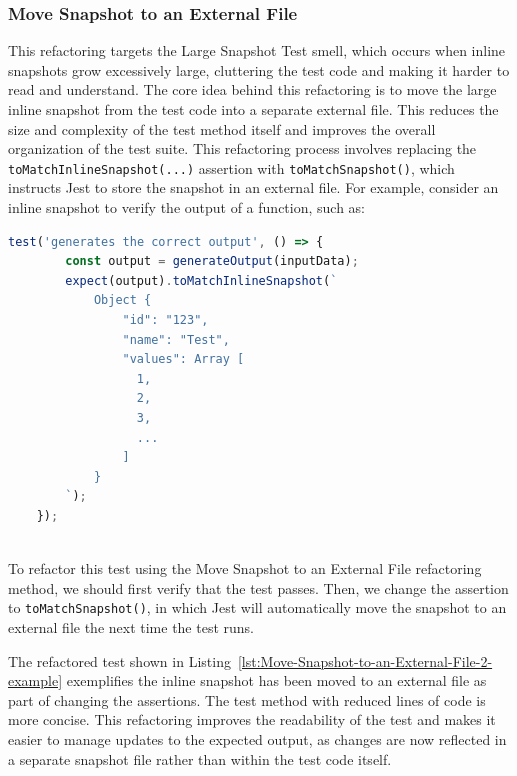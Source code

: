 \documentclass[
	msc, %
	english %
]{../ppgccufmg}
\begin{document}
        \subsubsection{Move Snapshot to an External File}
        
        This refactoring targets the Large Snapshot Test smell, which occurs when inline snapshots grow excessively large, cluttering the test code and making it harder to read and understand. The core idea behind this refactoring is to move the large inline snapshot from the test code into a separate external file. This reduces the size and complexity of the test method itself and improves the overall organization of the test suite. This refactoring process involves replacing the \texttt{toMatchInlineSnapshot(...)} assertion with \texttt{toMatchSnapshot()}, which instructs Jest to store the snapshot in an external file. For example, consider an inline snapshot to verify the output of a function, such as:
        
        \begin{lstlisting}[language=javascript, caption=Large snapshot test due to an inline snapshot, label=lst:Move-Snapshot-to-an-External-File-example]
    test('generates the correct output', () => {
        const output = generateOutput(inputData);
        expect(output).toMatchInlineSnapshot(`
            Object {
                "id": "123",
                "name": "Test",
                "values": Array [
                  1,
                  2,
                  3,
                  ...
                ]
            }
        `);
    });
                
        \end{lstlisting}
        
        To refactor this test using the Move Snapshot to an External File refactoring method, we should first verify that the test passes. Then, we change the assertion to \texttt{toMatchSnapshot()}, in which Jest will automatically move the snapshot to an external file the next time the test runs. 
        
        The refactored test shown in Listing~\ref{lst:Move-Snapshot-to-an-External-File-2-example} exemplifies the inline snapshot has been moved to an external file as part of changing the assertions. The test method with reduced lines of code is more concise. This refactoring improves the readability of the test and makes it easier to manage updates to the expected output, as changes are now reflected in a separate snapshot file rather than within the test code itself.
\end{document}
